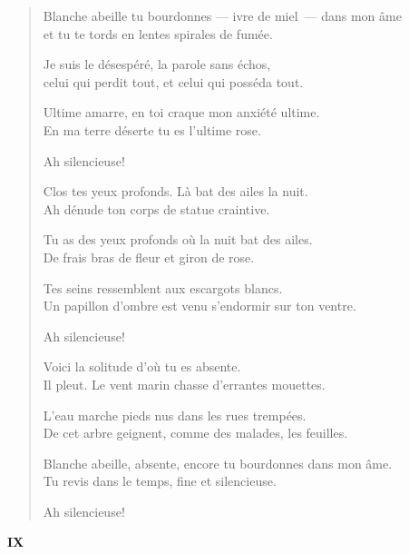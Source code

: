 \documentclass[11pt,a4paper]{book}
\begin{document}
\begin{verse}
  Blanche abeille tu bourdonnes --- ivre de miel~--- dans mon âme \\
  et tu te tords en lentes spirales de fumée.

  Je suis le désespéré, la parole sans échos, \\
  celui qui perdit tout, et celui qui posséda tout.

  Ultime amarre, en toi craque mon anxiété ultime. \\
  En ma terre déserte tu es l'ultime rose.

  Ah silencieuse!

  Clos tes yeux profonds. Là bat des ailes la nuit. \\
  Ah dénude ton corps de statue craintive.

  Tu as des yeux profonds où la nuit bat des ailes. \\
  De frais bras de fleur et giron de rose.

  Tes seins ressemblent aux escargots blancs. \\
  Un papillon d'ombre est venu s'endormir sur ton ventre.

  Ah silencieuse!

  Voici la solitude d'où tu es absente. \\
  Il pleut. Le vent marin chasse d'errantes mouettes.

  L'eau marche pieds nus dans les rues trempées. \\
  De cet arbre geignent, comme des malades, les feuilles.

  Blanche abeille, absente, encore tu bourdonnes dans mon âme. \\
  Tu revis dans le temps, fine et silencieuse.

  Ah silencieuse!
\end{verse}

\newpage


\begin{center} \textbf{IX} \end{center}

\bigskip
\end{document}
